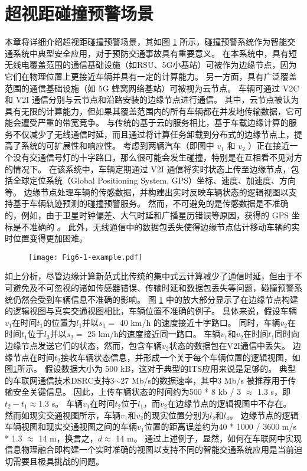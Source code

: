\section{超视距碰撞预警场景}\label{section 5-2}

本章将详细介绍超视距碰撞预警场景，其如图 \ref{fig 5-1} 所示，碰撞预警系统作为智能交通系统中典型安全应用，对于预防交通事故具有重要意义。
在本系统中，具有短无线电覆盖范围的通信基础设施（如RSU、5G小基站）可被作为边缘节点，因为它们在物理位置上更接近车辆并具有一定的计算能力。
另一方面，具有广泛覆盖范围的通信基础设施（如 5G 蜂窝网络基站）可被视为云节点。
车辆可通过 V2C 和 V2I 通信分别与云节点和沿路安装的边缘节点进行通信。
其中，云节点被认为具有无限的计算能力，但如果其覆盖范围内的所有车辆都在并发地传输数据，它可能会遭受严重的带宽竞争。 
与传统的基于云的服务相比，基于车载边缘计算的服务不仅减少了无线通信时延，而且通过将计算任务卸载到分布式的边缘节点上，提高了系统的可扩展性和响应性。
考虑到两辆汽车（即图中 $v_1$ 和 $v_2$ ）正在接近一个没有交通信号灯的十字路口，那么很可能会发生碰撞，特别是在互相看不见对方的情况下。
在该系统中，车辆定期通过 V2I 通信将实时状态上传至边缘节点，包括全球定位系统（Global Positioning System, GPS）坐标、速度、加速度、方向等。
边缘节点处理车辆的传感数据，并构建出实时反映车辆状态的逻辑视图以支持基于车辆轨迹预测的碰撞预警服务。
然而，不可避免的是传感数据是不准确的，例如，由于卫星时钟偏差、大气时延和广播星历错误等原因，获得的 GPS 坐标是不准确的 \cite{liu2013improving}。
此外，无线通信中的数据包丢失使得边缘节点估计移动车辆的实时位置变得更加困难。

\begin{figure}[h]
	\centering
	\texttt{[image: Fig6-1-example.pdf]}
	\label{fig 5-1}
\end{figure}

如上分析，尽管边缘计算新范式比传统的集中式云计算减少了通信时延，但由于不可避免及不可忽视的诸如传感器错误、传输时延和数据包丢失等问题，碰撞预警系统仍然会受到车辆信息不准确的影响。
图 \ref{fig 5-1} 中的放大部分显示了在边缘节点构建的逻辑视图与真实交通视图相比，车辆位置不准确的例子。
具体来说，假设车辆$v_1$在时间$t_1$的位置为$l_1$并以$s_1 =$ 40 km/h 的速度接近十字路口。
同时，车辆$v_2$在时间$t_1$位于$l_3$并以$s_2=$ 25 km/h的速度接近同一路口。
车辆$v_1$和$v_2$在时间$t_1$同时向边缘节点发送它们的状态，然而，包含车辆$v_2$状态的数据包在V2I通信中丢失。
边缘节点在时间$t_2$接收车辆状态信息，并形成一个关于每个车辆位置的逻辑视图，如图\ref{fig 5-1}所示。
假设数据大小为 500 kB，这对于典型的ITS应用来说是足够的\cite{liu2013improving}。
典型的车联网通信技术DSRC支持3$\sim$27 Mb/s的数据速率，其中3 Mb/s 被推荐用于传输安全关键信息\cite{kenney2011dedicated}。
因此，上传车辆状态的时间约为500 * 8 kb / 3 $\approx$ 1.3 s，即${t_2} - {t_1} \approx 1.3$ s。
车辆$v_1$在时间$t_2$位于$l_1$，而$v_2$在边缘节点的逻辑视图中不存在。
然而如现实交通视图所示，车辆$v_1$和$v_2$的现实位置分别为$l_2$和$l_4$。
边缘节点的逻辑车辆视图和现实交通视图之间的车辆$v_1$位置的距离误差约为40 * 1000 / 3600 m/s * 1.3 $\approx$ 14 m，换言之，$d \approx$ 14 m。
通过上述例子，显然，如何在车联网中实现信息物理融合即构建一个实时准确的视图以支持不同的智能交通系统应用是当前迫切需要且极具挑战的问题。

